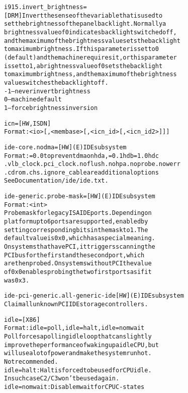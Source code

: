 \documentclass[a4paper,8pt,english]{sphinxmanual}
\begin{document}
\begin{alltt}
        i915.invert\_brightness=
                        {[}DRM{]} Invert the sense of the variable that is used to
                        set the brightness of the panel backlight. Normally a
                        brightness value of 0 indicates backlight switched off,
                        and the maximum of the brightness value sets the backlight
                        to maximum brightness. If this parameter is set to 0
                        (default) and the machine requires it, or this parameter
                        is set to 1, a brightness value of 0 sets the backlight
                        to maximum brightness, and the maximum of the brightness
                        value switches the backlight off.
                        -1 -- never invert brightness
                         0 -- machine default
                         1 -- force brightness inversion

        icn=            {[}HW,ISDN{]}
                        Format: \textless{}io\textgreater{}{[},\textless{}membase\textgreater{}{[},\textless{}icn\_id\textgreater{}{[},\textless{}icn\_id2\textgreater{}{]}{]}{]}

        ide-core.nodma= {[}HW{]} (E)IDE subsystem
                        Format: =0.0 to prevent dma on hda, =0.1 hdb =1.0 hdc
                        .vlb\_clock .pci\_clock .noflush .nohpa .noprobe .nowerr
                        .cdrom .chs .ignore\_cable are additional options
                        See Documentation/ide/ide.txt.

        ide-generic.probe-mask= {[}HW{]} (E)IDE subsystem
                        Format: \textless{}int\textgreater{}
                        Probe mask for legacy ISA IDE ports.  Depending on
                        platform up to 6 ports are supported, enabled by
                        setting corresponding bits in the mask to 1.  The
                        default value is 0x0, which has a special meaning.
                        On systems that have PCI, it triggers scanning the
                        PCI bus for the first and the second port, which
                        are then probed.  On systems without PCI the value
                        of 0x0 enables probing the two first ports as if it
                        was 0x3.

        ide-pci-generic.all-generic-ide {[}HW{]} (E)IDE subsystem
                        Claim all unknown PCI IDE storage controllers.

        idle=           {[}X86{]}
                        Format: idle=poll, idle=halt, idle=nomwait
                        Poll forces a polling idle loop that can slightly
                        improve the performance of waking up a idle CPU, but
                        will use a lot of power and make the system run hot.
                        Not recommended.
                        idle=halt: Halt is forced to be used for CPU idle.
                        In such case C2/C3 won't be used again.
                        idle=nomwait: Disable mwait for CPU C-states


\end{alltt}
\end{document}
